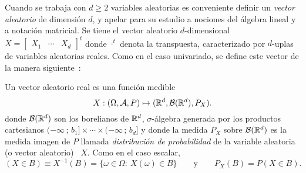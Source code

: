 Cuando se trabaja  con $d\geq 2$ variables aleatorias  es conveniente definir un
{\it vector aleatorio}  de dimensi\'on $d$, y apelar para  su estudio a nociones
del \'algebra  lineal y  a notaci\'on matricial.   Se tiene el  vector aleatorio
$d$-dimensional \ $X = \begin{bmatrix} X_1 & \cdots & X_d \end{bmatrix}^t$ donde
$\cdot^t$  denota  la  transpuesta,  caracterizado por  $d$-uplas  de  variables
aleatorias reales.   Como en  el caso  univariado, se define  este vector  de la
manera siguiente~\cite{AthLah06, Coh13, Bre88}:
%
\begin{definicion}
  Un vector aleatorio real es una funci\'on medible
  \[
  X: (\Omega,\mathcal{A},P) \mapsto (\mathbb{R}^d,\mathcal{B}(\mathbb{R}^d),P_X).
  \]
  donde  $\mathcal{B}(\mathbb{R}^d)$  son  los  borelianos  de  $\mathbb{R}^d$,  $\sigma$-\'algebra
  generada por  los productos cartesianos $(-\infty  \, ; \,  b_1] \times \cdots
  \times (-\infty \,  ; \, b_d]$ y donde la medida  $P_X$ sobre $\mathcal{B}(\mathbb{R}^d)$ es
  la medida  imagen de  $P$ llamada {\it  distribuci\'on de probabilidad}  de la
  variable aleatoria (o vector aleatorio) \ $X$. Como en el caso escalar,
 \[
 (X \in B) \equiv X^{-1}(B) = \{ \omega \in \Omega: \: X(\omega) \in B \} \qquad
 \mbox{y} \qquad P_X(B) = P(X \in B).
 \]
\end{definicion}
%
\noindent  {}

\

